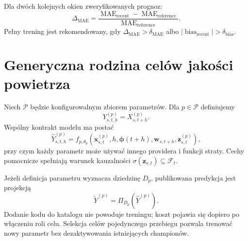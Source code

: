 \documentclass[11pt,a4paper,oneside]{article}
\begin{document}
Dla dwóch kolejnych okien zweryfikowanych prognoz:
\begin{equation}
 \Delta_{\mathrm{MAE}}=
 \frac{\operatorname{MAE}_{\mathrm{recent}}-
       \operatorname{MAE}_{\mathrm{reference}}}
      {\operatorname{MAE}_{\mathrm{reference}}}.
\end{equation}
Pełny trening jest rekomendowany, gdy
$\Delta_{\mathrm{MAE}}>\delta_{\mathrm{MAE}}$ albo
$|\operatorname{bias}_{\mathrm{recent}}|>\delta_{\mathrm{bias}}$.


\section{Generyczna rodzina celów jakości powietrza}

Niech $\mathcal P$ będzie konfigurowalnym zbiorem parametrów. Dla
$p\in\mathcal P$ definiujemy
\[
 Y^{(p)}_{s,t,h}=X^{(p)}_{s,t+h}.
\]
Wspólny kontrakt modelu ma postać
\[
 \widehat Y^{(p)}_{s,t,h}=f_{p,\theta_p}
 \left(\bm x^{(p)}_{s,t},h,\bm\phi(t+h),
       \bm w_{s,t+h},\bm z^{(p)}_{s,t}\right),
\]
przy czym każdy parametr może używać innego providera i funkcji straty.
Cechy pomocnicze spełniają warunek kauzalności
$\sigma(\bm z_{s,t})\subseteq\mathcal F_t$.

Jeżeli definicja parametru wyznacza dziedzinę $D_p$, publikowana predykcja jest
projekcją
\[
 \widetilde Y^{(p)}=\Pi_{D_p}(\widehat Y^{(p)}).
\]
Dodanie kodu do katalogu nie powoduje treningu; koszt pojawia się dopiero po
włączeniu roli celu. Selekcja celów pojedynczego przebiegu pozwala trenować
nowy parametr bez dezaktywowania istniejących championów.
\end{document}
